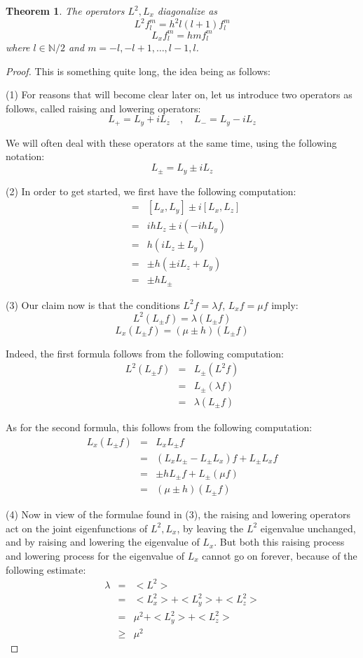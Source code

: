 \documentclass[12pt]{amsbook}
\newtheorem{theorem}{Theorem}[chapter]
\begin{document}
\begin{theorem}
The operators $L^2,L_x$ diagonalize as
$$L^2f_l^m=h^2l(l+1)f_l^m$$
$$L_xf_l^m=hmf_l^m$$
where $l\in\mathbb N/2$ and $m=-l,-l+1,\ldots,l-1,l$.
\end{theorem} 

\begin{proof}
This is something quite long, the idea being as follows:

\medskip

(1) For reasons that will become clear later on, let us introduce two operators as follows, called raising and lowering operators:
$$L_+=L_y+iL_z\quad,\quad 
L_-=L_y-iL_z$$

We will often deal with these operators at the same time, using the following notation:
$$L_\pm=L_y\pm iL_z$$

(2) In order to get started, we first have the following computation:
\begin{eqnarray*}
[L_x,L_\pm]
&=&[L_x,L_y]\pm i[L_x,L_z]\\
&=&ihL_z\pm i(-ihL_y)\\
&=&h(iL_z\pm L_y)\\
&=&\pm h(\pm iL_z+L_y)\\
&=&\pm hL_\pm
\end{eqnarray*}

(3) Our claim now is that the conditions $L^2f=\lambda f$, $L_xf=\mu f$ imply:
$$L^2(L_\pm f)=\lambda(L_\pm f)$$
$$L_x(L_\pm f)=(\mu\pm h)(L_\pm f)$$

Indeed, the first formula follows from the following computation:
\begin{eqnarray*}
L^2(L_\pm f)
&=&L_\pm(L^2 f)\\
&=&L_\pm(\lambda f)\\
&=&\lambda(L_\pm f)
\end{eqnarray*}

As for the second formula, this follows from the following computation:
\begin{eqnarray*}
L_x(L_\pm f)
&=&L_xL_\pm f\\
&=&(L_xL_\pm-L_\pm L_x)f+L_\pm L_xf\\
&=&\pm hL_\pm f+L_\pm(\mu f)\\
&=&(\mu\pm h)(L_\pm f)
\end{eqnarray*}

(4) Now in view of the formulae found in (3), the raising and lowering operators act on the joint eigenfunctions of $L^2,L_x$, by leaving the $L^2$ eigenvalue unchanged, and by raising and lowering the eigenvalue of $L_x$. But both this raising process and lowering process for the eigenvalue of $L_x$ cannot go on forever, because of the following estimate:
\begin{eqnarray*}
\lambda
&=&<L^2>\\
&=&<L_x^2>+<L_y^2>+<L_z^2>\\
&=&\mu^2+<L_y^2>+<L_z^2>\\
&\geq&\mu^2
\end{eqnarray*}


\end{proof}
\end{document}
